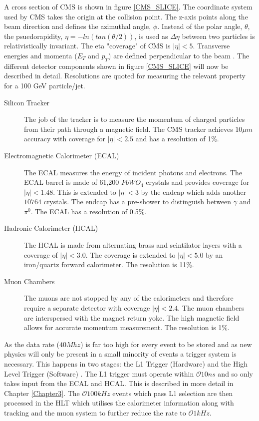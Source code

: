A cross section of CMS is shown in figure \ref{CMS_SLICE}. The coordinate system used by CMS takes the origin at the collision point. The z-axis points along the beam direction and defines the azimuthal angle, $\phi$. Instead of the polar angle, $\theta$, the psuedorapidity, $\eta=-ln(tan(\theta/2))$, is used as $\Delta \eta$ between two particles is relativistically invariant. The eta "coverage" of CMS is $|\eta|<5$. Transverse energies and momenta ($E_T $ and $p_T$)  are defined perpendicular to the beam \cite{cmsiop}. The different detector components shown in figure \ref{CMS_SLICE} will now be described in detail. Resolutions are quoted for measuring the relevant property for a 100 GeV particle/jet\cite{SACharacteristics}.
\begin{description}
\item[Silicon Tracker]The job of the tracker is to measure the momentum of charged particles from their path through a magnetic field. The CMS tracker achieves $10\mu m$ accuracy with coverage for $|\eta|<2.5$ and has a resolution of 1\%.
\item[Electromagnetic Calorimeter (ECAL)] The ECAL measures the energy of incident photons and electrons. The ECAL barrel is made of 61,200 $PbWO_4$ crystals and provides coverage for $|\eta|<1.48$\cite{ecal}. This is extended to $|\eta|<3$ by the endcap which adds another $10764$ crystals. The endcap has a pre-shower to distinguish between $\gamma$ and $\pi^0$. The ECAL has a resolution of 0.5\%.
 \item[Hadronic Calorimeter (HCAL)] The HCAL is made from alternating brass and scintilator layers with a coverage of $|\eta|<3.0$\cite{hcal}. The coverage is extended to  $|\eta|<5.0$ by an iron/quartz forward calorimeter\cite{hfhcal}. The resolution is 11\%. 
 \item[Muon Chambers]The muons are not stopped by any of the calorimeters and therefore require a separate detector with coverage $|\eta| < 2.4$. The muon chambers are interspersed with the magnet return yoke. The high magnetic field allows for accurate momentum measurement\cite{muons}. The resolution is 1\%.
\end{description}
As the data rate ($40Mhz$) is far too high for every event to be stored and as new physics will only be present in a small minority of events a trigger system is necessary. This happens in two stages: the L1 Trigger (Hardware) and the High Level Trigger (Software) \cite{HLT}. The L1 trigger must operate within $\mathcal{O}10ns$ and so only takes input from the ECAL and HCAL. This is described in more detail in Chapter \ref{Chapter3}. The $\mathcal{O}100kHz$ events which pass L1 selection are then processed in the HLT which utilises the calorimeter information along with tracking and the muon system to further reduce the rate to $\mathcal{O}1kHz$.